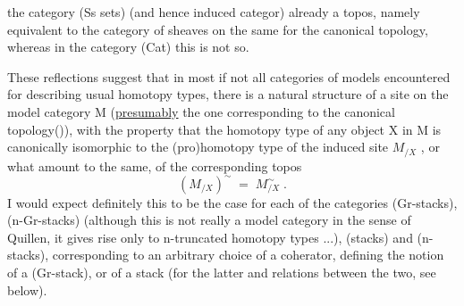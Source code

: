 
the category  (Ss sets) (and hence  induced categor)  already
a topos,  namely equivalent to the category of sheaves on the same for
the canonical topology,  whereas in the category (Cat)  this is not so.

These reflections suggest that in most if not all categories of
models encountered for describing usual homotopy types,  there is a 
natural structure of a site on the model category M (\uline{presumably} the one
corresponding to the canonical topology()), with the property that the
homotopy type of any object X in M is  canonically isomorphic to the
(pro)homotopy type of the induced site $M_{/X}$ ,  or what amount to the same,
of the corresponding topos
\[ (M_{/X})^{\sim} \;=\; M^{\sim}_{/X} \;. \]
I would expect definitely this to be the case for each of the categories
(Gr-stacks), (n-Gr-stacks) (although this is not really a model category
in the sense of Quillen, it gives rise only to n-truncated homotopy
types ...),  (stacks)  and (n-stacks),  corresponding to an arbitrary \margin{$\lceil$}
choice of a coherator,  defining the notion of a (Gr-stack),  or of a \margin{$[$}
stack  (for the latter and relations between the two,  see below). \margin{$\lfloor$}

